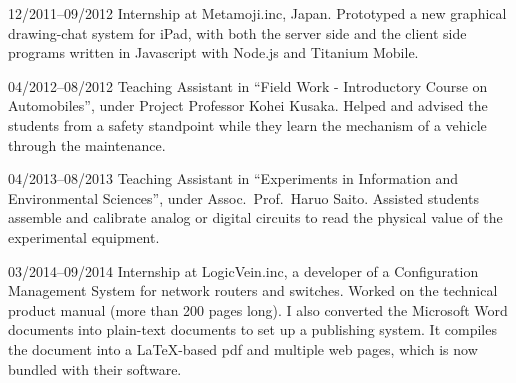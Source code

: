 \documentclass[a4paper]{article}
\begin{document}
\begin{CV}

\item[12/2011--09/2012] Internship at Metamoji.inc, Japan.
  Prototyped a new graphical drawing-chat system for
 iPad, with both the server side and the client side programs
 written in Javascript with Node.js and Titanium Mobile.

\item[04/2012--08/2012] Teaching Assistant in ``Field Work -
 Introductory Course on Automobiles'', under
 Project Professor Kohei Kusaka.
 Helped and advised the students from a safety standpoint while they
 learn the mechanism of a vehicle through the maintenance.
 
\item[04/2013--08/2013] Teaching Assistant in ``Experiments in
 Information and Environmental Sciences'', under
 Assoc.\ Prof.\ Haruo Saito.
 Assisted students assemble and calibrate analog or digital
 circuits to read the physical value of the
 experimental equipment.

\item[03/2014--09/2014] Internship at LogicVein.inc,
 a developer of a Configuration Management System
 for network routers and switches.
 Worked on %
 the technical product manual (more than 200 pages long). %
 I also converted the Microsoft Word documents into
 plain-text documents to set up a publishing system.  It compiles the
 document into a \LaTeX{}-based pdf and multiple web pages, which is now bundled
 with their software.
\end{CV}
\end{document}
